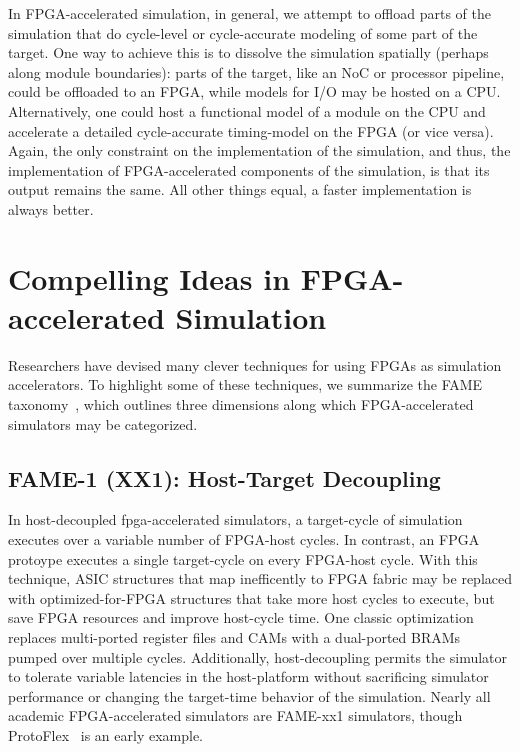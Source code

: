 
In FPGA-accelerated simulation, in general, we attempt to offload parts of the
simulation that do cycle-level or cycle-accurate modeling of some part of the
target. One way to achieve this is to dissolve the simulation spatially
(perhaps along module boundaries): parts of the target, like an NoC or
processor pipeline, could be offloaded to an FPGA, while models for I/O may be
hosted on a CPU.  Alternatively, one could host a functional model of a module
on the CPU and accelerate a detailed cycle-accurate timing-model on the FPGA
(or vice versa).  Again, the only constraint on the implementation of the
simulation, and thus, the implementation of FPGA-accelerated components of the
simulation, is that its output remains the same. All other things equal, a
faster implementation is always better.

\section{Compelling Ideas in FPGA-accelerated Simulation}

Researchers have devised many clever techniques for using FPGAs as simulation
accelerators. To highlight some of these techniques, we summarize the FAME
taxonomy~\cite{fame}, which outlines three dimensions along which
FPGA-accelerated simulators may be categorized.

\subsection{FAME-1 (XX1): Host-Target Decoupling}\label{sec:fame1}

In host-decoupled fpga-accelerated simulators, a target-cycle of simulation
executes over a variable number of FPGA-host cycles. In contrast, an
FPGA protoype executes a single target-cycle on every FPGA-host cycle. With
this technique, ASIC structures that map inefficently to FPGA fabric may be replaced
with optimized-for-FPGA structures that take more host cycles to execute, but save
FPGA resources and improve host-cycle time.  One classic optimization replaces
multi-ported register files and CAMs with a dual-ported BRAMs pumped over
multiple cycles.  Additionally, host-decoupling permits the simulator to
tolerate variable latencies in the host-platform without sacrificing simulator
performance or changing the target-time behavior of the simulation. Nearly all
academic FPGA-accelerated simulators are FAME-xx1 simulators, though
ProtoFlex~\cite{protoflex} is an early example.

